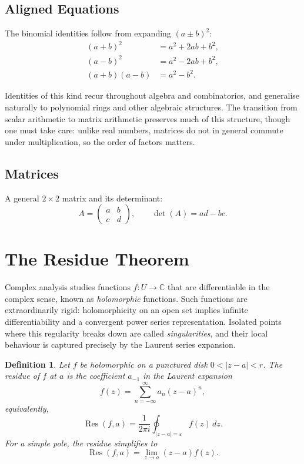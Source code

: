 \documentclass{article}
\newtheorem{definition}[theorem]{Definition}
\begin{document}
\subsection{Aligned Equations}

The binomial identities follow from expanding $(a \pm b)^2$:
\begin{align}
  (a + b)^{2}      &= a^{2} + 2ab + b^{2},      \\
  (a - b)^{2}      &= a^{2} - 2ab + b^{2},      \\
  (a + b)(a - b)   &= a^{2} - b^{2}.
\end{align}

Identities of this kind recur throughout algebra and combinatorics, and generalise
naturally to polynomial rings and other algebraic structures. The transition from
scalar arithmetic to matrix arithmetic preserves much of this structure, though one
must take care: unlike real numbers, matrices do not in general commute under
multiplication, so the order of factors matters.

\subsection{Matrices}

A general $2 \times 2$ matrix and its determinant:
\begin{equation}
  A = \begin{pmatrix} a & b \\ c & d \end{pmatrix}, \qquad
  \det(A) = ad - bc.
\end{equation}

\section{The Residue Theorem}

Complex analysis studies functions $f\colon U \to \mathbb{C}$ that are differentiable
in the complex sense, known as \emph{holomorphic} functions. Such functions are
extraordinarily rigid: holomorphicity on an open set implies infinite differentiability
and a convergent power series representation. Isolated points where this regularity
breaks down are called \emph{singularities}, and their local behaviour is captured
precisely by the Laurent series expansion.

\begin{definition}
  Let $f$ be holomorphic on a punctured disk $0 < |z - a| < r$.  The \emph{residue}
  of $f$ at $a$ is the coefficient $a_{-1}$ in the Laurent expansion
  \begin{equation}
    f(z) = \sum_{n=-\infty}^{\infty} a_n (z - a)^n,
  \end{equation}
  equivalently,
  \begin{equation}
    \operatorname{Res}(f, a)
      = \frac{1}{2\pi i} \oint_{|z-a|=\varepsilon} f(z)\,dz.
  \end{equation}
  For a simple pole, the residue simplifies to
  \begin{equation}
    \operatorname{Res}(f, a) = \lim_{z \to a}(z - a)f(z).
  \end{equation}
\end{definition}
\end{document}
